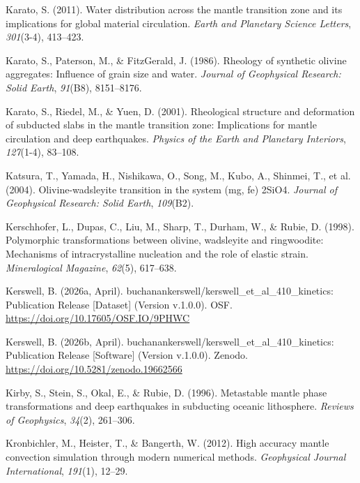 \documentclass[draft,linenumbers]{agujournal2019}
\newlength{\cslhangindent}
\newenvironment{CSLReferences}[2]
 {\begin{list}{}{
  \setlength{\itemindent}{0pt}
  \setlength{\leftmargin}{0pt}
  \setlength{\parsep}{0pt}
  \ifodd #1
   \setlength{\leftmargin}{\cslhangindent}
   \setlength{\itemindent}{-\cslhangindent}
  \fi
  \setlength{\itemsep}{#2\baselineskip}
  }
  \item\relax}
 {\end{list}}
\begin{document}
\begin{CSLReferences}{1}{0}
Karato, S. (2011). Water distribution across the mantle transition zone
and its implications for global material circulation. \emph{Earth and
Planetary Science Letters}, \emph{301}(3-4), 413--423.

Karato, S., Paterson, M., \& FitzGerald, J. (1986). Rheology of
synthetic olivine aggregates: Influence of grain size and water.
\emph{Journal of Geophysical Research: Solid Earth}, \emph{91}(B8),
8151--8176.

Karato, S., Riedel, M., \& Yuen, D. (2001). Rheological structure and
deformation of subducted slabs in the mantle transition zone:
Implications for mantle circulation and deep earthquakes. \emph{Physics
of the Earth and Planetary Interiors}, \emph{127}(1-4), 83--108.

{Katsura, T., Yamada, H., Nishikawa, O., Song, M., Kubo, A., Shinmei,
T., et al.} (2004). Olivine-wadsleyite transition in the system (mg, fe)
2SiO4. \emph{Journal of Geophysical Research: Solid Earth},
\emph{109}(B2).

Kerschhofer, L., Dupas, C., Liu, M., Sharp, T., Durham, W., \& Rubie, D.
(1998). Polymorphic transformations between olivine, wadsleyite and
ringwoodite: Mechanisms of intracrystalline nucleation and the role of
elastic strain. \emph{Mineralogical Magazine}, \emph{62}(5), 617--638.

Kerswell, B. (2026a, April).
{buchanankerswell/kerswell\_et\_al\_410\_kinetics: Publication Release
{[}Dataset{]}} (Version v.1.0.0). OSF.
\url{https://doi.org/10.17605/OSF.IO/9PHWC}

Kerswell, B. (2026b, April).
{buchanankerswell/kerswell\_et\_al\_410\_kinetics: Publication Release
{[}Software{]}} (Version v.1.0.0). Zenodo.
\url{https://doi.org/10.5281/zenodo.19662566}

Kirby, S., Stein, S., Okal, E., \& Rubie, D. (1996). Metastable mantle
phase transformations and deep earthquakes in subducting oceanic
lithosphere. \emph{Reviews of Geophysics}, \emph{34}(2), 261--306.

Kronbichler, M., Heister, T., \& Bangerth, W. (2012). High accuracy
mantle convection simulation through modern numerical methods.
\emph{Geophysical Journal International}, \emph{191}(1), 12--29.


\end{CSLReferences}
\end{document}

